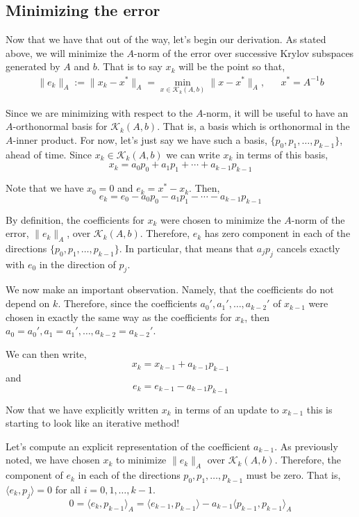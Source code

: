 \hypertarget{minimizing-the-error}{%
\subsection{Minimizing the error}\label{minimizing-the-error}}

Now that we have that out of the way, let's begin our derivation. As
stated above, we will minimize the \(A\)-norm of the error over
successive Krylov subspaces generated by \(A\) and \(b\). That is to say
\(x_k\) will be the point so that, \begin{align*}
\|e_k\|_A
:=\| x_k - x^* \|_A 
= \min_{x\in\mathcal{K}_k(A,b)} \| x - x^* \|_A
,&&
x^* = A^{-1}b
\end{align*}

Since we are minimizing with respect to the \(A\)-norm, it will be
useful to have an \(A\)-orthonormal basis for \(\mathcal{K}_k(A,b)\).
That is, a basis which is orthonormal in the \(A\)-inner product. For
now, let's just say we have such a basis,
\(\{p_0,p_1,\ldots,p_{k-1}\}\), ahead of time. Since
\(x_k\in\mathcal{K}_k(A,b)\) we can write \(x_k\) in terms of this
basis, \[
x_k = a_0 p_0 + a_1 p_1 + \cdots + a_{k-1} p_{k-1}
\]

Note that we have \(x_0 = 0\) and \(e_k = x^* - x_k\). Then, \[
e_k = e_0 - a_0p_0 - a_1 p_1 - \cdots - a_{k-1} p_{k-1}
\]

By definition, the coefficients for \(x_k\) were chosen to minimize the
\(A\)-norm of the error, \(\|e_k\|_A\), over \(\mathcal{K}_k(A,b)\).
Therefore, \(e_k\) has zero component in each of the directions
\(\{ p_0,p_1,\ldots,p_{k-1} \}\). In particular, that means that
\(a_jp_j\) cancels exactly with \(e_0\) in the direction of \(p_j\).

We now make an important observation. Namely, that the coefficients do
not depend on \(k\). Therefore, since the coefficients
\(a_0',a_1',\ldots,a_{k-2}'\) of \(x_{k-1}\) were chosen in exactly the
same way as the coefficients for \(x_k\), then
\(a_0=a_0', a_1=a_1', \ldots, a_{k-2}=a_{k-2}'\).

We can then write, \[
x_k = x_{k-1} + a_{k-1} p_{k-1}
\] and \[
e_k = e_{k-1} - a_{k-1} p_{k-1}
\]

Now that we have explicitly written \(x_k\) in terms of an update to
\(x_{k-1}\) this is starting to look like an iterative method!

Let's compute an explicit representation of the coefficient \(a_{k-1}\).
As previously noted, we have chosen \(x_k\) to minimize \(\|e_k\|_A\)
over \(\mathcal{K}_k(A,b)\). Therefore, the component of \(e_k\) in each
of the directions \(p_0,p_1,\ldots,p_{k-1}\) must be zero. That is,
\(\langle e_k , p_j \rangle = 0\) for all \(i=0,1,\ldots, k-1\). \[
0 = \langle e_k , p_{k-1} \rangle_A
= \langle e_{k-1}, p_{k-1} \rangle - a_{k-1} \langle p_{k-1} , p_{k-1} \rangle_A
\]

